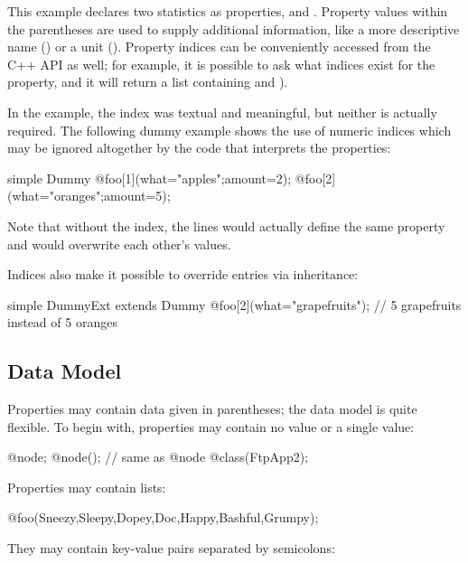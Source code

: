 This example declares two statistics as  properties,
 and . Property values within the
parentheses are used to supply additional information, like a more descriptive
name () or a unit (). Property indices can be
conveniently accessed from the C++ API as well; for example, it is possible to
ask what indices exist for the  property, and it will return a
list containing  and ).

In the  example, the index was textual and meaningful, but
neither is actually required. The following dummy example shows the use of
numeric indices which may be ignored altogether by the code that interprets the
properties:

\begin{ned}
simple Dummy {
    @foo[1](what="apples";amount=2);
    @foo[2](what="oranges";amount=5);
}
\end{ned}

Note that without the index, the lines would actually define the same 
property and would overwrite each other's values.

Indices also make it possible to override entries via inheritance:

\begin{ned}
simple DummyExt extends Dummy {
    @foo[2](what="grapefruits"); // 5 grapefruits instead of 5 oranges
}
\end{ned}


\subsection{Data Model}
\label{sec:ned-lang:property-data-model}

Properties may contain data given in parentheses; the data model is quite
flexible. To begin with, properties may contain no value or a single value:

\begin{ned}
@node;
@node(); // same as @node
@class(FtpApp2);
\end{ned}

Properties may contain lists:

\begin{ned}
@foo(Sneezy,Sleepy,Dopey,Doc,Happy,Bashful,Grumpy);
\end{ned}

They may contain key-value pairs separated by semicolons:

